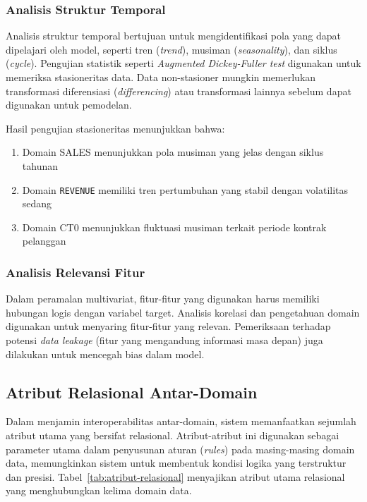 \subsubsection{Analisis Struktur Temporal}

Analisis struktur temporal bertujuan untuk mengidentifikasi pola yang dapat dipelajari oleh model, seperti tren (\textit{trend}), musiman (\textit{seasonality}), dan siklus (\textit{cycle}). Pengujian statistik seperti \textit{Augmented Dickey-Fuller test} digunakan untuk memeriksa stasioneritas data. Data non-stasioner mungkin memerlukan transformasi diferensiasi (\textit{differencing}) atau transformasi lainnya sebelum dapat digunakan untuk pemodelan.

Hasil pengujian stasioneritas menunjukkan bahwa:
\begin{enumerate}
    \item Domain SALES menunjukkan pola musiman yang jelas dengan siklus tahunan
    \item Domain \texttt{REVENUE} memiliki tren pertumbuhan yang stabil dengan volatilitas sedang
    \item Domain CT0 menunjukkan fluktuasi musiman terkait periode kontrak pelanggan
\end{enumerate}

\subsubsection{Analisis Relevansi Fitur}

Dalam peramalan multivariat, fitur-fitur yang digunakan harus memiliki hubungan logis dengan variabel target. Analisis korelasi dan pengetahuan domain digunakan untuk menyaring fitur-fitur yang relevan. Pemeriksaan terhadap potensi \textit{data leakage} (fitur yang mengandung informasi masa depan) juga dilakukan untuk mencegah bias dalam model.

\subsection{Atribut Relasional Antar-Domain}
\label{subsec:atribut-relasional}

Dalam menjamin interoperabilitas antar-domain, sistem memanfaatkan sejumlah atribut utama yang bersifat relasional. Atribut-atribut ini digunakan sebagai parameter utama dalam penyusunan aturan (\textit{rules}) pada masing-masing domain data, memungkinkan sistem untuk membentuk kondisi logika yang terstruktur dan presisi. Tabel~\ref{tab:atribut-relasional} menyajikan atribut utama relasional yang menghubungkan kelima domain data.


